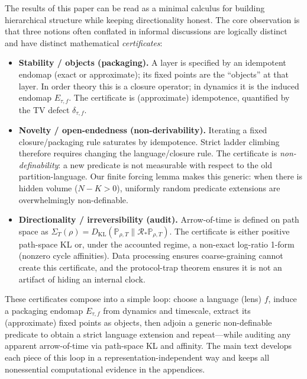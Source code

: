 \documentclass[11pt]{article}
\theoremstyle{remark}
\begin{document}
The results of this paper can be read as a minimal calculus for building hierarchical structure while keeping directionality honest.
The core observation is that three notions often conflated in informal discussions are logically distinct and have distinct mathematical \emph{certificates}:

\begin{itemize}
  \item \textbf{Stability / objects (packaging).} A layer is specified by an idempotent endomap (exact or approximate); its fixed points are the “objects” at that layer.
  In order theory this is a closure operator; in dynamics it is the induced endomap $E_{\tau,f}$.
  The certificate is (approximate) idempotence, quantified by the TV defect $\delta_{\tau,f}$.
  \item \textbf{Novelty / open-endedness (non-derivability).} Iterating a fixed closure/packaging rule saturates by idempotence.
  Strict ladder climbing therefore requires changing the language/closure rule.
  The certificate is \emph{non-definability}: a new predicate is not measurable with respect to the old partition-language.
  Our finite forcing lemma makes this generic: when there is hidden volume ($N-K>0$), uniformly random predicate extensions are overwhelmingly non-definable.
  \item \textbf{Directionality / irreversibility (audit).} Arrow-of-time is defined on path space as $\Sigma_T(\rho)=D_{\mathrm{KL}}(\mathbb P_{\rho,T}\|\mathcal R_*\mathbb P_{\rho,T})$.
  The certificate is either positive path-space KL or, under the accounted regime, a non-exact log-ratio 1-form (nonzero cycle affinities).
  Data processing ensures coarse-graining cannot create this certificate, and the protocol-trap theorem ensures it is not an artifact of hiding an internal clock.
\end{itemize}

These certificates compose into a simple loop:
choose a language (lens) $f$, induce a packaging endomap $E_{\tau,f}$ from dynamics and timescale, extract its (approximate) fixed points as objects, then adjoin a generic non-definable predicate to obtain a strict language extension and repeat—while auditing any apparent arrow-of-time via path-space KL and affinity.
The main text develops each piece of this loop in a representation-independent way and keeps all nonessential computational evidence in the appendices.
\end{document}
